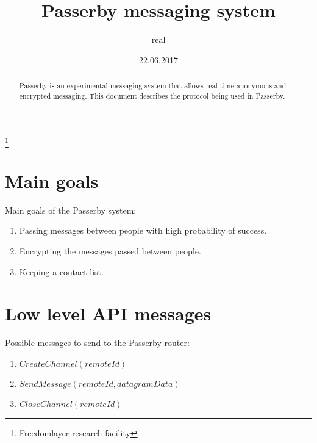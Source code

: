 \documentclass{amsart}
\theoremstyle{definition}
\theoremstyle{remark}
\numberwithin{equation}{section}
\begin{document}
\title{Passerby messaging system}

\author{real}
\thanks{Freedomlayer research facility}



\date{22.06.2017}
\maketitle

\begin{abstract}
  Passerby is an experimental messaging system that allows real time anonymous
  and encrypted messaging. This document describes the protocol being used in
  Passerby.
\end{abstract}

\section{Main goals}

Main goals of the Passerby system:

\begin{enumerate}
  \item Passing messages between people with high probability of success.
  \item Encrypting the messages passed between people.
  \item Keeping a contact list.
\end{enumerate}


\section{Low level API messages}

Possible messages to send to the Passerby router:
\begin{enumerate}
  \item $CreateChannel (remoteId)$
  \item $SendMessage (remoteId, datagramData)$
  \item $CloseChannel (remoteId)$
\end{enumerate}
\end{document}
